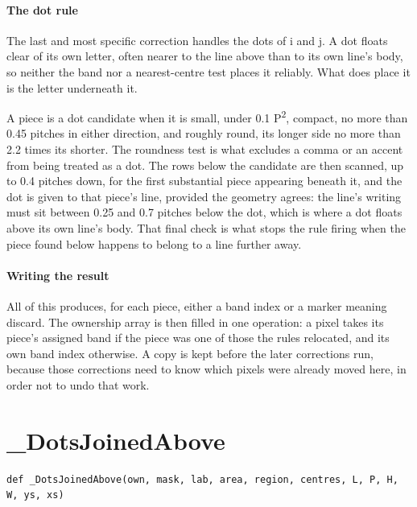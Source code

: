 \paragraph{The dot rule}
The last and most specific correction handles the dots of i and j. A dot floats clear of its own letter, often nearer to the line above than to its own line's body, so neither the band nor a nearest-centre test places it reliably. What does place it is the letter underneath it.

A piece is a dot candidate when it is small, under 0.1 P\textsuperscript{2}, compact, no more than 0.45 pitches in either direction, and roughly round, its longer side no more than 2.2 times its shorter. The roundness test is what excludes a comma or an accent from being treated as a dot. The rows below the candidate are then scanned, up to 0.4 pitches down, for the first substantial piece appearing beneath it, and the dot is given to that piece's line, provided the geometry agrees: the line's writing must sit between 0.25 and 0.7 pitches below the dot, which is where a dot floats above its own line's body. That final check is what stops the rule firing when the piece found below happens to belong to a line further away.


\paragraph{Writing the result}
All of this produces, for each piece, either a band index or a marker meaning discard. The ownership array is then filled in one operation: a pixel takes its piece's assigned band if the piece was one of those the rules relocated, and its own band index otherwise. A copy is kept before the later corrections run, because those corrections need to know which pixels were already moved here, in order not to undo that work.


\section{\_DotsJoinedAbove}
\begin{lstlisting}[style=sig]
def _DotsJoinedAbove(own, mask, lab, area, region, centres, L, P, H, W, ys, xs)
\end{lstlisting}

